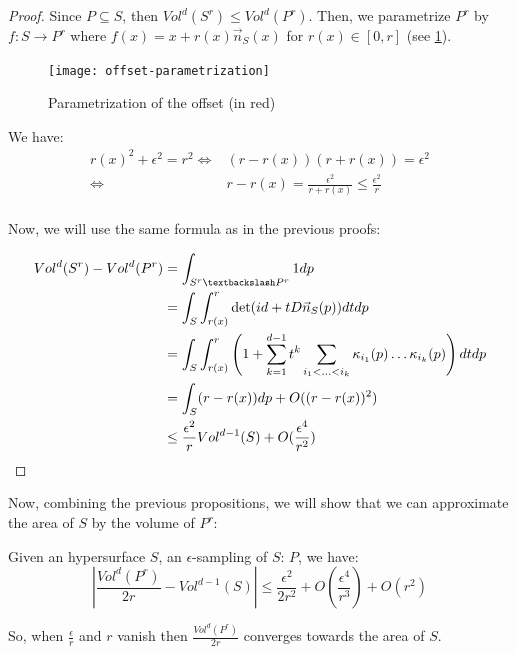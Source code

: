 \begin{proof}
    Since $ P \subseteq S $, then $ Vol^d(S^r) \leq Vol^d(P^r) $. Then, we
    parametrize $ P^r $ by $ f : S \rightarrow P^r $ where $ f(x) = x + r(x)
    \vec{n}_S(x) $ for $ r(x) \in [0, r] $ (see
    \ref{fig:offset-parametrization}).

    \begin{figure}[h]
        \centering
        \texttt{[image: offset-parametrization]}
        \caption{Parametrization of the offset (in red)}
        \label{fig:offset-parametrization}
    \end{figure}

    We have:
    \begin{align*}
        r(x)^2 + \epsilon^2 = r^2 \iff& (r - r(x)) (r + r(x)) = \epsilon^2 \\
        \iff& r - r(x) = \frac{\epsilon^2}{r + r(x)} \leq \frac{\epsilon^2}{r} \\
    \end{align*}

    Now, we will use the same formula as in the previous proofs:

    \begin{align*}
        Vol^d(S^r) - Vol^d(P^r) &= \int_{S^r \textbackslash P^r} 1 dp \\
        &= \int_S \int_{r(x)}^r \det(id + t D \vec{n}_S(p)) dt dp \\
        &= \int_S \int_{r(x)}^r \left( 1 + \sum_{k=1}^{d-1} t^k \sum_{i_1 < \ldots
                < i_k} \kappa_{i_1}(p) \ldots \kappa_{i_k}(p) \right) dt dp \\
        &= \int_S (r - r(x)) dp + O((r - r(x))^2) \\
        &\leq \frac{\epsilon^2}{r} Vol^{d-1}(S) + O(\frac{\epsilon^4}{r^2})
    \end{align*}
\end{proof}

Now, combining the previous propositions, we will show that we can approximate
the area of $ S $ by the volume of $ P^r $:

\begin{proposition}
    \label{prop:approx-volume-area}
    Given an hypersurface $ S $, an $\epsilon$-sampling of $ S $: $ P $, we
    have:
    $$ | \frac{Vol^d(P^r)}{2r} - Vol^{d-1}(S) | \leq \frac{\epsilon^2}{2r^2} +
    O(\frac{\epsilon^4}{r^3}) + O(r^2) $$

    So, when $ \frac{\epsilon}{r} $ and $ r $ vanish then $
    \frac{Vol^d(P^r)}{2r} $ converges towards the area of $ S $.
\end{proposition}

